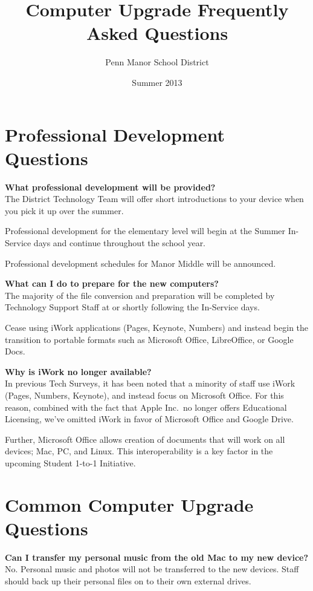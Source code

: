 \documentclass[10pt,foldmark,notumble]{leaflet}
\title{Computer Upgrade Frequently Asked Questions}
\author{Penn Manor School District}
\date{Summer 2013}
\begin{document}
\maketitle
\thispagestyle{empty}
\section{Professional Development Questions\color{red}\hrulefill\color{black}} 
\textbf{What professional development will be provided?}\\
The District Technology Team will offer short introductions to your device when you pick it up over the summer.

Professional development for the elementary level will begin at the Summer In-Service days and continue throughout the school year.

Professional development schedules for Manor Middle will be announced.

\textbf{What can I do to prepare for the new computers?}\\
The majority of the file conversion and preparation will be completed by Technology Support Staff at or shortly following the In-Service days. 

Cease using iWork applications (Pages, Keynote, Numbers) and instead begin the transition to portable formats such as Microsoft Office, LibreOffice, or Google Docs.

\textbf{Why is iWork no longer available?}\\
In previous Tech Surveys, it has been noted that a minority of staff use iWork (Pages, Numbers, Keynote), and instead focus on Microsoft Office. For this reason, combined with the fact that Apple Inc.\ no longer offers Educational Licensing, we've omitted iWork in favor of Microsoft Office and Google Drive. 

Further, Microsoft Office allows creation of documents that will work on all devices; Mac, PC, and Linux. This interoperability is a key factor in the upcoming Student 1-to-1 Initiative. 

\section{Common Computer Upgrade Questions\color{red}\hrulefill\color{black}}
\textbf{Can I transfer my personal music from the old Mac to my new device?}\\
No. Personal music and photos will not be transferred to the new devices. Staff should back up their personal files on to their own external drives.
\end{document}
